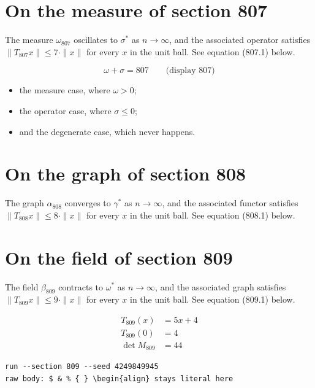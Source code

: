 \documentclass{article}
\begin{document}
\section{On the measure of section 807}
The measure $\omega_{807}$ oscillates to $\sigma^{*}$ as $n \to \infty$,
and the associated operator satisfies $\|T_{807} x\| \leq 7 \cdot \|x\|$
for every $x$ in the unit ball. See equation (807.1) below.

$$
\omega + \sigma = 807 \qquad \text{(display 807)}
$$

\begin{itemize}
  \item the measure case, where $\omega > 0$;
  \item the operator case, where $\sigma \leq 0$;
  \item and the degenerate case, which never happens.
\end{itemize}

\section{On the graph of section 808}
The graph $\alpha_{808}$ converges to $\gamma^{*}$ as $n \to \infty$,
and the associated functor satisfies $\|T_{808} x\| \leq 8 \cdot \|x\|$
for every $x$ in the unit ball. See equation (808.1) below.

\section{On the field of section 809}
The field $\beta_{809}$ contracts to $\omega^{*}$ as $n \to \infty$,
and the associated graph satisfies $\|T_{809} x\| \leq 9 \cdot \|x\|$
for every $x$ in the unit ball. See equation (809.1) below.

\begin{align}
T_{809}(x) &= 5 x + 4 \\
T_{809}(0) &= 4 \\
\det M_{809} &= 44
\end{align}

\begin{verbatim}
run --section 809 --seed 4249849945
raw body: $ & % { } \begin{align} stays literal here
\end{verbatim}
\end{document}
